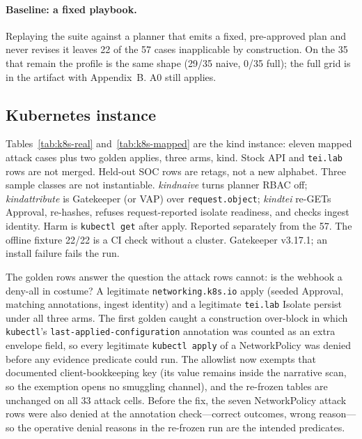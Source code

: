 \documentclass[acmsmall,manuscript,review,anonymous]{acmart}
\renewcommand{\_}{\discretionary{\textunderscore}{}{\textunderscore}}
\begin{document}
\paragraph{Baseline: a fixed playbook.}
Replaying the suite against a planner that emits a fixed, pre-approved plan and
never revises it leaves 22 of the 57 cases inapplicable by construction. On
the 35 that remain the profile is the same shape (29/35 naive, 0/35 full);
the full grid is in the artifact with Appendix~B. A0 still applies.

\subsection{Kubernetes instance}
\label{sec:eval-k8s}

Tables~\ref{tab:k8s-real} and~\ref{tab:k8s-mapped} are the kind instance:
eleven mapped attack cases plus two golden applies, three arms, kind.
Stock {API} and \texttt{tei.lab} rows are not merged. Held-out {SOC}
rows are retags, not a new alphabet. Three sample classes are not
instantiable. \emph{kind\_naive} turns planner {RBAC} off;
\emph{kind\_attribute} is Gatekeeper (or {VAP}) over
\texttt{request.object}; \emph{kind\_tei} re-{GET}s Approval, re-hashes,
refuses request-reported isolate readiness, and checks ingest identity.
Harm is \texttt{kubectl get} after apply. Reported separately from the 57.
The offline fixture 22/22 is a {CI} check without a cluster. Gatekeeper
v3.17.1; an install failure fails the run.

The golden rows answer the question the attack rows cannot: is the webhook
a deny-all in costume? A legitimate \texttt{networking.k8s.io} apply
(seeded Approval, matching annotations, ingest identity) and a legitimate
\texttt{tei.lab} Isolate persist under all three arms. The first golden
caught a construction over-block in which
\texttt{kubectl}'s \texttt{last-applied-\allowbreak configuration} annotation was
counted as an extra envelope field, so every legitimate \texttt{kubectl
apply} of a NetworkPolicy was denied before any evidence predicate could
run. The allowlist now exempts that documented client-bookkeeping key (its
value remains inside the narrative scan, so the exemption opens no
smuggling channel), and the re-frozen tables are unchanged on all 33
attack cells. Before the fix, the seven NetworkPolicy attack rows were
also denied at the annotation check---correct outcomes, wrong reason---so
the operative denial reasons in the re-frozen run are the intended
predicates.
\end{document}
